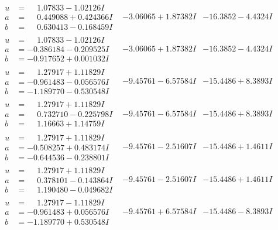 \documentclass[1p]{elsarticle_modified}
\theoremstyle{definition}
\begin{document}
$$\begin{array}{c|c|c}
\begin{aligned}
u &= \phantom{-}1.07833 - 1.02126 I \\
a &= \phantom{-}0.449088 + 0.424366 I \\
b &= \phantom{-}0.630413 - 0.168459 I\end{aligned}
 & -3.06065 + 1.87382 I & -16.3852 - 4.4324 I \\ \hline\begin{aligned}
u &= \phantom{-}1.07833 - 1.02126 I \\
a &= -0.386184 - 0.209525 I \\
b &= -0.917652 + 0.001032 I\end{aligned}
 & -3.06065 + 1.87382 I & -16.3852 - 4.4324 I \\ \hline\begin{aligned}
u &= \phantom{-}1.27917 + 1.11829 I \\
a &= -0.961483 - 0.056576 I \\
b &= -1.189770 - 0.530548 I\end{aligned}
 & -9.45761 - 6.57584 I & -15.4486 + 8.3893 I \\ \hline\begin{aligned}
u &= \phantom{-}1.27917 + 1.11829 I \\
a &= \phantom{-}0.732710 - 0.225798 I \\
b &= \phantom{-}1.16663 + 1.14759 I\end{aligned}
 & -9.45761 - 6.57584 I & -15.4486 + 8.3893 I \\ \hline\begin{aligned}
u &= \phantom{-}1.27917 + 1.11829 I \\
a &= -0.508257 + 0.483174 I \\
b &= -0.644536 - 0.238801 I\end{aligned}
 & -9.45761 - 2.51607 I & -15.4486 + 1.4611 I \\ \hline\begin{aligned}
u &= \phantom{-}1.27917 + 1.11829 I \\
a &= \phantom{-}0.378101 - 0.143864 I \\
b &= \phantom{-}1.190480 - 0.049682 I\end{aligned}
 & -9.45761 - 2.51607 I & -15.4486 + 1.4611 I \\ \hline\begin{aligned}
u &= \phantom{-}1.27917 - 1.11829 I \\
a &= -0.961483 + 0.056576 I \\
b &= -1.189770 + 0.530548 I\end{aligned}
 & -9.45761 + 6.57584 I & -15.4486 - 8.3893 I \\ \hline\begin{aligned}

\end{aligned}
\end{array}$$
\end{document}
